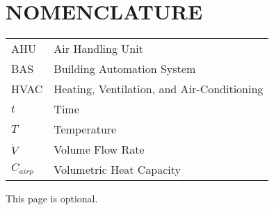 %
%
%


\chapter*{NOMENCLATURE}

\begin{tabular}{ll}
AHU  & Air Handling Unit\tabularnewline
BAS & Building Automation System\tabularnewline
HVAC & Heating, Ventilation, and Air-Conditioning\tabularnewline
\(t\)  & Time\tabularnewline
\(T\) & Temperature\tabularnewline
\(\dot{V}\) & Volume Flow Rate \tabularnewline 
\(C_{airp}\) & Volumetric Heat Capacity \tabularnewline
\end{tabular}


\vspace{2em}

This page is optional.

\pagebreak{}